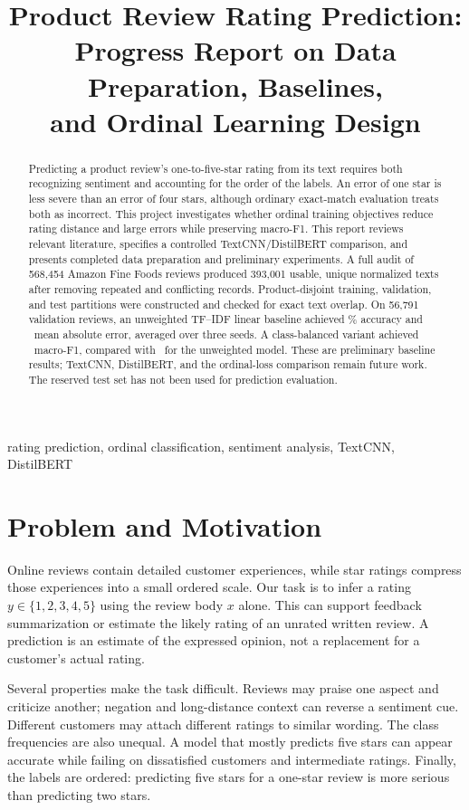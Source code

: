 \documentclass[conference]{IEEEtran}
\title{Product Review Rating Prediction:\\Progress Report on Data Preparation, Baselines,\\and Ordinal Learning Design}
\author{\IEEEauthorblockN{Efe Han Kele\c{s}, Mehmet Ege A\c{s}an, and Faris Aleem Ahmad}
\IEEEauthorblockA{CS 415 Project Progress Report\\November 16, 2026}}
\begin{document}
\maketitle

\begin{abstract}
Predicting a product review's one-to-five-star rating from its text requires both recognizing sentiment and accounting for the order of the labels. An error of one star is less severe than an error of four stars, although ordinary exact-match evaluation treats both as incorrect. This project investigates whether ordinal training objectives reduce rating distance and large errors while preserving macro-F1. This report reviews relevant literature, specifies a controlled TextCNN/DistilBERT comparison, and presents completed data preparation and preliminary experiments. A full audit of 568,454 Amazon Fine Foods reviews produced 393,001 usable, unique normalized texts after removing repeated and conflicting records. Product-disjoint training, validation, and test partitions were constructed and checked for exact text overlap. On 56,791 validation reviews, an unweighted TF--IDF linear baseline achieved \UnweightedAcc\% accuracy and \UnweightedMAE\ mean absolute error, averaged over three seeds. A class-balanced variant achieved \BalancedFone\ macro-F1, compared with \UnweightedFone\ for the unweighted model. These are preliminary baseline results; TextCNN, DistilBERT, and the ordinal-loss comparison remain future work. The reserved test set has not been used for prediction evaluation.
\end{abstract}
\begin{IEEEkeywords}
rating prediction, ordinal classification, sentiment analysis, TextCNN, DistilBERT
\end{IEEEkeywords}

\section{Problem and Motivation}
Online reviews contain detailed customer experiences, while star ratings compress those experiences into a small ordered scale. Our task is to infer a rating $y\in\{1,2,3,4,5\}$ using the review body $x$ alone. This can support feedback summarization or estimate the likely rating of an unrated written review. A prediction is an estimate of the expressed opinion, not a replacement for a customer's actual rating.

Several properties make the task difficult. Reviews may praise one aspect and criticize another; negation and long-distance context can reverse a sentiment cue. Different customers may attach different ratings to similar wording. The class frequencies are also unequal. A model that mostly predicts five stars can appear accurate while failing on dissatisfied customers and intermediate ratings. Finally, the labels are ordered: predicting five stars for a one-star review is more serious than predicting two stars.
\end{document}
